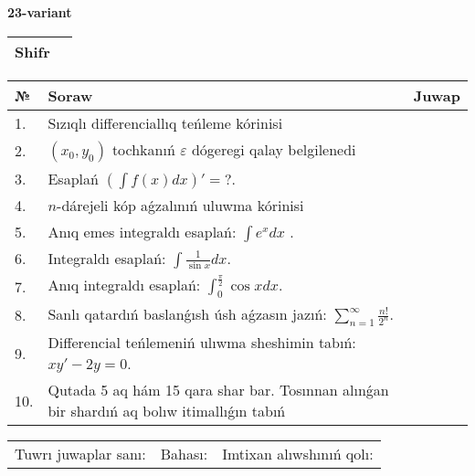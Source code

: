 \documentclass{article}
\begin{document}
  \egroup
  
  \newpage
  
  
  \textbf{23-variant}\\
  
  \bgroup
  \def\arraystretch{1.6} %
  
  \begin{tabular}{|m{5.7cm}|m{9.5cm}|}
  \hline
  Shifr & \\
  \hline
  \end{tabular}
  
  \vspace{1cm}
  
  \begin{tabular}{|m{0.7cm}|m{10cm}|m{4cm}|}
  \hline
  № & Soraw & Juwap \\
  \hline
  1. & Sızıqlı differenciallıq teńleme kórinisi &  \\
  \hline
  2. & \((x_0,y_0)\) tochkanıń \(\varepsilon\) dógeregi qalay belgilenedi &  \\
  \hline
  3. & Esaplań \(\left( \int{f(x)dx} \right)' = ?\). &  \\
  \hline
  4. & \(n\)-dárejeli kóp aǵzalınıń uluwma kórinisi &  \\
  \hline
  5. & Anıq emes integraldı esaplań: \(\int{e^{x}dx}\) . &  \\
  \hline
  6. & Integraldı esaplań: \(\int{\frac{1}{\sin x}dx}\). &  \\
  \hline
  7. & Anıq integraldı esaplań: \(\int_{0}^{\frac{\pi}{2}}{\cos xdx}\). &  \\
  \hline
  8. & Sanlı qatardıń baslanǵısh úsh aǵzasın jazıń: \(\sum_{n = 1}^{\infty}\frac{n!}{2^{n}}\). &  \\
  \hline
  9. & Differencial teńlemeniń ulıwma sheshimin tabıń: \(xy' - 2y = 0\). &  \\
  \hline
  10. & Qutada 5 aq hám 15 qara shar bar. Tosınnan alınǵan bir shardıń aq bolıw itimallıǵın tabıń &  \\
  \hline
  \end{tabular}
  
  \vspace{1cm}
  
  \begin{tabular}{lll}
  Tuwrı juwaplar sanı: \underline{\hspace{1.5cm}} & 
  Bahası: \underline{\hspace{1.5cm}} & 
  Imtixan alıwshınıń qolı: \underline{\hspace{2cm}} \\
  \end{tabular}
  
\end{document}

